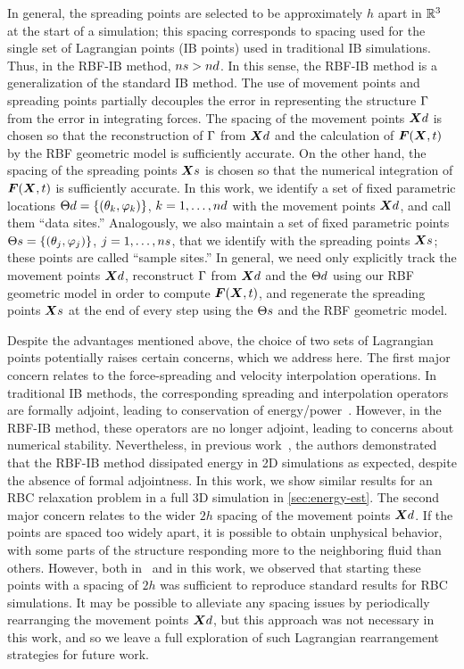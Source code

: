 In general, the spreading points are selected to be approximately $h$ apart in $\mathbb{R}^3$ at the start of a
simulation; this spacing corresponds to spacing used for the single set of Lagrangian points (IB points) used in
traditional IB simulations. Thus, in the RBF-IB method, $\sample\cardinality > \data\cardinality$. In this sense,
the RBF-IB method is a generalization of the standard IB method. The use of movement points and spreading points
partially decouples the error in representing the structure $\Gamma$ from the error in integrating forces. The
spacing of the movement points $\data\X$ is chosen so that the reconstruction of $\Gamma$ from $\data\X$ and
the calculation of $\boldsymbol{F}(\boldsymbol{X}, t)$ by the RBF geometric model is sufficiently accurate. On the other hand, the spacing
of the spreading points $\sample\X$ is chosen so that the numerical integration of $\boldsymbol{F}(\boldsymbol{X}, t)$ is sufficiently
accurate. In this work, we identify a set of fixed parametric locations $\data\sites = \{(\theta_k, \varphi_k)\}$,
$k=1, \ldots, \data\cardinality$ with the movement points $\data\X$, and call them ``data sites\qend.''
Analogously, we also maintain a set of fixed parametric points $\sample\sites = \{(\theta_j, \varphi_j)\}$,
$j=1, \ldots, \sample\cardinality$, that we identify with the spreading points $\sample\X$; these points are
called ``sample sites\qend.'' In general, we need only explicitly track the movement points $\data\X$, reconstruct
$\Gamma$ from $\data\X$ and the $\data\sites$ using our RBF geometric model in order to compute $\boldsymbol{F}(\boldsymbol{X}, t)$,
and regenerate the spreading points $\sample\X$ at the end of every step using the $\sample\sites$ and the RBF
geometric model.

Despite the advantages mentioned above, the choice of two sets of Lagrangian points potentially raises certain
concerns, which we address here. The first major concern relates to the force-spreading and velocity interpolation
operations. In traditional IB methods, the corresponding spreading and interpolation operators are formally
adjoint, leading to conservation of energy/power~\cite{Peskin:2002go}. However, in the RBF-IB method, these
operators are no longer adjoint, leading to concerns about numerical stability. Nevertheless, in previous
work~\cite{Shankar:2015km}, the authors demonstrated that the RBF-IB method dissipated energy in 2D simulations as
expected, despite the absence of formal adjointness. In this work, we show similar results for an RBC relaxation
problem in a full 3D simulation in \cref{sec:energy-est}. The second major concern relates to the wider $2h$
spacing of the movement points $\data\X$. If the points are spaced too widely apart, it is possible to obtain
unphysical behavior, with some parts of the structure responding more to the neighboring fluid than others.
However, both in~\cite{Shankar:2015km} and in this work, we observed that starting these points with a spacing of
$2h$ was sufficient to reproduce standard results for RBC simulations. It may be possible to alleviate any spacing
issues by periodically rearranging the movement points $\data\X$, but this approach was not necessary in this
work, and so we leave a full exploration of such Lagrangian rearrangement strategies for future work.

